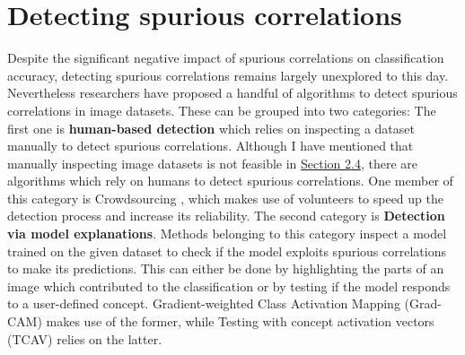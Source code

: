 \documentclass{article}
\begin{document}
\section{Detecting spurious correlations}
Despite the significant negative impact of spurious correlations on classification accuracy,
detecting spurious correlations remains largely unexplored to this day.
Nevertheless researchers have proposed a handful of algorithms to detect spurious correlations
in image datasets. These can be grouped into two categories: The first one is \textbf{human-based detection}
which relies on inspecting a dataset manually to detect spurious correlations. Although I have mentioned that
manually inspecting image datasets is not feasible in \hyperref[sec:challenges]{Section 2.4},
there are algorithms which rely on humans to detect spurious correlations. One member of this category is
Crowdsourcing \cite{10.1145/3366423.3380063}, which makes use of volunteers to speed up the detection process and increase its reliability.
The second category is \textbf{Detection via model explanations}. Methods belonging to this category inspect a model trained on the given dataset to check if the model exploits spurious correlations to make its predictions. This can either be done by highlighting the parts of an image which contributed to the classification or by testing if the model responds to a user-defined concept. Gradient-weighted Class Activation Mapping (Grad-CAM) \cite{Selvaraju_2017_ICCV} makes use of the former, while Testing with concept activation vectors (TCAV) \cite{pmlr-v80-kim18d} relies on the latter.
\end{document}
